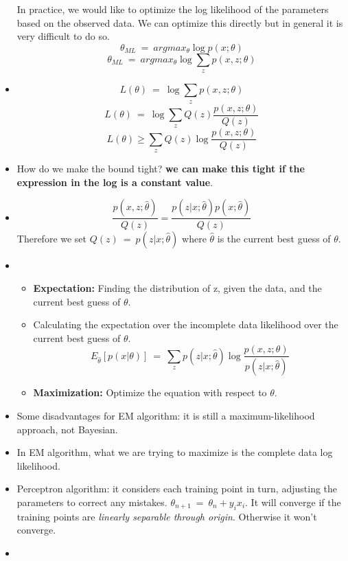 \documentclass[twocolumn]{article}
\begin{document}
\begin{itemize}
  In practice, we would like to optimize the log likelihood of the
  parameters based on the observed data. We can optimize this directly
  but in general it is very difficult to do so.
  $$\theta_{ML}~=~argmax_{\theta}\log p(x;\theta)$$
  $$\theta_{ML}~=~argmax_{\theta}\log\sum_{z}p(x,z;\theta)$$
\item $$L(\theta)~=~\log\sum_{z}p(x,z;\theta)$$
  $$L(\theta)~=~\log\sum_{z}Q(z)\frac{p(x,z;\theta)}{Q(z)}$$
  $$L(\theta)\geq\sum_{z}Q(z)\log\frac{p(x,z;\theta)}{Q(z)}$$
\item How do we make the bound tight? \textbf{we can make this tight if
    the expression in the log is a constant value}.
\item $$\frac{p(x,z;\hat{\theta})}{Q(z)}=\frac{p(z|x;\hat{\theta})p(x;\hat\theta)}{Q(z)}$$
  Therefore we set $Q(z)~=~p(z|x;\hat{\theta})$ where $\hat{\theta}$
  is the current best guess of $\theta$.
\item
  \begin{itemize}
  \item \textbf{Expectation:}  Finding the distribution of z, given
    the data, and the current best guess of $\theta$.
  \item Calculating the expectation over the incomplete data
    likelihood over the current best guess of $\theta$.
    \begin{equation}
      \label{eq:1}
      E_{\hat{\theta}}[p(x|\theta)]~=~\sum_{z}p(z|x;\hat{\theta})\log\frac{p(x,z;\theta)}{p(z|x;\hat{\theta})}
    \end{equation}
  \item \textbf{Maximization:} Optimize the equation with respect to $\theta$.
  \end{itemize}
\item Some disadvantages for EM algorithm: it is still a
  maximum-likelihood approach, not Bayesian.
\item In EM algorithm, what we are trying to maximize is the complete
  data log likelihood.
\item Perceptron algorithm: it considers each training point in turn,
  adjusting the parameters to correct any
  mistakes. $\theta_{n+1}~=~\theta_{n}+y_{i}x_{i}$. It will converge
  if the training points are \emph{linearly separable through
    origin}. Otherwise it won't converge.
\item 
\end{itemize}
\end{document}
